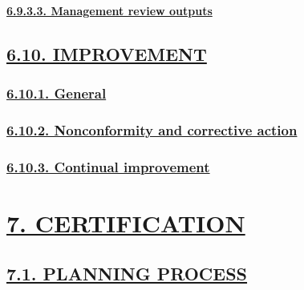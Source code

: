 \documentclass[
]{article}
\begin{document}
\hypertarget{management-review-outputs}{%
\paragraph{\texorpdfstring{\protect\hyperlink{management-review-outputs-1}{6.9.3.3.
Management review
outputs}}{6.9.3.3. Management review outputs}}\label{management-review-outputs}}

\hypertarget{improvement}{%
\subsection{\texorpdfstring{\protect\hyperlink{improvement-1}{6.10.
IMPROVEMENT}}{6.10. IMPROVEMENT}}\label{improvement}}

\hypertarget{general-8}{%
\subsubsection{\texorpdfstring{\protect\hyperlink{general-17}{6.10.1.
General}}{6.10.1. General}}\label{general-8}}

\hypertarget{nonconformity-and-corrective-action}{%
\subsubsection{\texorpdfstring{\protect\hyperlink{nonconformity-and-corrective-action-1}{6.10.2.
Nonconformity and corrective
action}}{6.10.2. Nonconformity and corrective action}}\label{nonconformity-and-corrective-action}}

\hypertarget{continual-improvement}{%
\subsubsection{\texorpdfstring{\protect\hyperlink{continual-improvement-1}{6.10.3.
Continual
improvement}}{6.10.3. Continual improvement}}\label{continual-improvement}}

\hypertarget{certification}{%
\section{\texorpdfstring{\protect\hyperlink{certification-1}{7.
CERTIFICATION}}{7. CERTIFICATION}}\label{certification}}

\hypertarget{planning-process}{%
\subsection{\texorpdfstring{\protect\hyperlink{planning-process-1}{7.1.
PLANNING PROCESS}}{7.1. PLANNING PROCESS}}\label{planning-process}}
\end{document}
